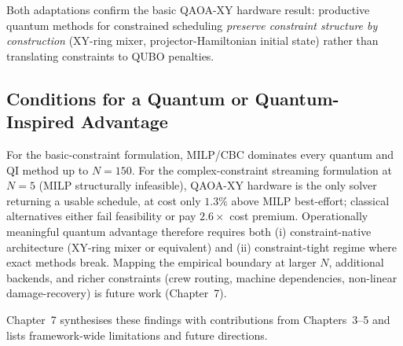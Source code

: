 Both adaptations confirm the basic QAOA-XY hardware result: productive quantum methods for constrained scheduling \emph{preserve constraint structure by construction} (XY-ring mixer, projector-Hamiltonian initial state) rather than translating constraints to QUBO penalties.

\subsection{Conditions for a Quantum or Quantum-Inspired Advantage}
For the basic-constraint formulation, MILP/CBC dominates every quantum and QI method up to $N=150$. For the complex-constraint streaming formulation at $N=5$ (MILP structurally infeasible), QAOA-XY hardware is the only solver returning a usable schedule, at cost only $1.3\%$ above MILP best-effort; classical alternatives either fail feasibility or pay $2.6\times$ cost premium. Operationally meaningful quantum advantage therefore requires both (i) constraint-native architecture (XY-ring mixer or equivalent) and (ii) constraint-tight regime where exact methods break. Mapping the empirical boundary at larger $N$, additional backends, and richer constraints (crew routing, machine dependencies, non-linear damage-recovery) is future work (Chapter~7).

Chapter~7 synthesises these findings with contributions from Chapters~3--5 and lists framework-wide limitations and future directions.
